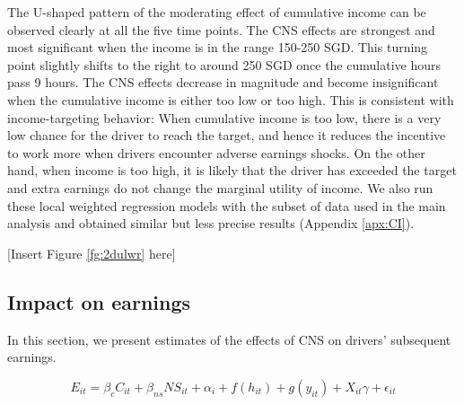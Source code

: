 \documentclass[reviewmode,AEJ]{AEA}
\begin{document}
The U-shaped pattern of the moderating effect of cumulative income can be observed clearly at all the five time points. The CNS effects are strongest and most significant when the income is in the range 150-250 SGD. This turning point slightly shifts to the right to around 250 SGD once the cumulative hours pass 9 hours. The CNS effects decrease in magnitude and become insignificant when the cumulative income is either too low or too high. This is consistent with income-targeting behavior: When cumulative income is too low, there is a very low chance for the driver to reach the target, and hence it reduces the incentive to work more when drivers encounter adverse earnings shocks. On the other hand, when income is too high, it is likely that the driver has exceeded the target and extra earnings do not change the marginal utility of income. We also run these local weighted regression models with the subset of data used in the main analysis and obtained similar but less precise results (Appendix \ref{apx:CI}).


\begin{center}
	[Insert Figure \ref{fg:2dulwr} here]
\end{center}

\subsection{Impact on earnings}
In this section, we present estimates of the effects of CNS on drivers' subsequent earnings.

\begin{equation}
\label{eq:outcomes}
E_{it} = \beta_c C_{it} + \beta_{ns} {NS}_{it} + \alpha_i + f(h_{it}) + g(y_{it}) + X_{it}\gamma  + \epsilon_{it}
\end{equation}
\end{document}
